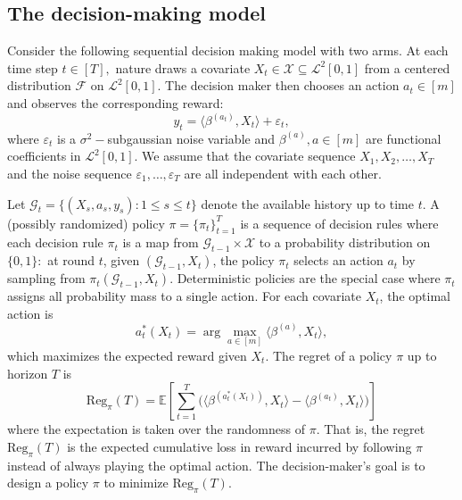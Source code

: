 \documentclass[mnsc]{informs3aa} %
\newcommand{\betaa}{\beta^{(a)}}
\newcommand{\Reg}{\mathrm{Reg}}
\newcommand{\mF}{\mathcal F}
\newcommand{\mL}{\mathcal L}
\newcommand{\mX}{\mathcal X}
\begin{document}
\subsection{The decision-making model}
Consider the following sequential decision making model with two arms. At each time step $t\in[T],$ nature draws a covariate $X_t\in\mX\subseteq\mL^2[0,1]$ from a centered distribution $\mF$ on $\mL^2[0,1].$ 
The decision maker then chooses an action $a_t\in[m]$ and observes the corresponding reward:
\begin{equation}\label{model: reward}
	y_t=\langle \beta^{(a_t)}, X_t\rangle+\varepsilon_t,
\end{equation}
where $\varepsilon_t$ is a $\sigma^2-$subgaussian noise variable and  $\betaa,a\in[m]$ are functional coefficients in $\mL^{2}[0,1].$ 
We assume that the covariate sequence $X_1,X_2,\ldots, X_T$ and the noise sequence $\varepsilon_1,\ldots,\varepsilon_T$ are all independent with each other.

Let $\mathcal{G}_{t}=\{(X_s,a_s,y_s):1\le s\le t\}$ denote the available history up to time $t$.  
A (possibly randomized) policy $\pi=\{\pi_t\}_{t=1}^T$ is a sequence of decision rules where each decision rule $\pi_t$ is a map from $\mathcal{G}_{t-1}\times\mathcal{X}$ to a probability distribution on $\{0,1\}:$
at round $t$, given $(\mathcal{G}_{t-1},X_t)$, the policy $\pi_t$ selects an action $a_t$ by sampling from $\pi_t(\mathcal{G}_{t-1},X_t)$.  
Deterministic policies are the special case where $\pi_t$ assigns all probability mass to a single action.  
For each covariate $X_t$, the optimal action is
\[
a_t^*(X_t) = \arg\max_{a\in[m]} \langle \beta^{(a)}, X_t \rangle,
\]
which maximizes the expected reward given $X_t$.  
The regret of a policy $\pi$ up to horizon $T$ is
\begin{equation}\label{def: regret}
	\Reg_\pi(T)
	= \mathbb{E}\!\left[\sum_{t=1}^T
	\big(\langle \beta^{(a_t^*(X_t))},X_t\rangle
	- \langle \beta^{(a_t)},X_t\rangle\big)\right]
\end{equation}
where the expectation is taken over the randomness of $\pi.$
That is, the regret $\Reg_{\pi}(T)$ is the expected cumulative loss in reward incurred by following $\pi$ instead of always playing the optimal action.
The decision-maker's goal is to design a policy $\pi$ to minimize $\Reg_\pi(T).$
\end{document}

